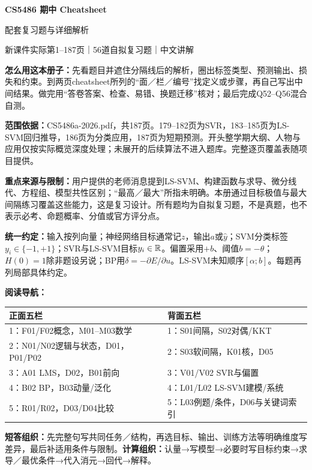 

{\LARGE\bfseries CS5486 期中 Cheatsheet\par 配套复习题与详细解析}\par\medskip
{\large 新课件实际第1--187页｜56道自拟复习题｜中文讲解}\par
\textbf{怎么用这本册子：}先看题目并遮住分隔线后的解析，圈出标签类型、预测输出、损失和约束。到两页cheatsheet所列的“面／栏／编号”找定义或步骤，再自己写出中间结果。做完用“答卷答案、检查、易错、换题迁移”核对；最后完成Q52--Q56混合自测。

\textbf{范围依据：}CS5486a-2026.pdf，共187页。179--182页为SVR，183--185页为LS-SVM回归推导，186页为分类应用，187页为短期预测。开头整学期大纲、人物与应用仅按实际概览深度处理；未展开的后续算法不进入题库。完整逐页覆盖表随项目提供。

\textbf{重点来源与限制：}用户提供的老师消息提到LS-SVM、构建函数与求导、微分线代、方程组、模型共性区别；“最高／最大”所指未明确。本册通过目标极值与最大间隔练习覆盖这些能力，这是复习设计。所有题均为自拟复习题，不是真题，也不表示必考、命题概率、分值或官方评分点。

\textbf{统一约定：}输入按列向量；神经网络目标通常记$z$，输出$a$或$\hat y$；SVM分类标签$y_i\in\{-1,+1\}$；SVR与LS-SVM目标$y_i\in\mathbb{R}$。偏置采用$+b$、阈值$b=-\theta$；$H(0)=1$除非题设另说；BP用$\delta=-\partial E/\partial u$。LS-SVM未知顺序$[\alpha;b]$。每题再列局部具体约定。

\textbf{阅读导航：}
\begin{center}\small\begin{tabular}{p{.44\linewidth}p{.44\linewidth}}
\toprule 正面五栏 & 背面五栏\\\midrule
1：F01/F02概念，M01--M03数学 & 1：S01间隔，S02对偶/KKT\\
2：N01/N02逻辑与状态，D01，P01/P02 & 2：S03软间隔，K01核，D05\\
3：A01 LMS，D02，B01前向 & 3：V01/V02 SVR与偏置\\
4：B02 BP，B03动量/泛化 & 4：L01/L02 LS-SVM建模/系统\\
5：R01/R02，D03/D04比较 & 5：L03例题/条件，D06与关键词索引\\\bottomrule
\end{tabular}\end{center}

\textbf{短答组织：}先完整句写共同任务／结构，再选目标、输出、训练方法等明确维度写差异，最后补适用条件与限制。\textbf{计算组织：}认量→写模型→必要时写目标约束→求导／最优条件→代入消元→回代→解释。

\clearpage\tableofcontents






